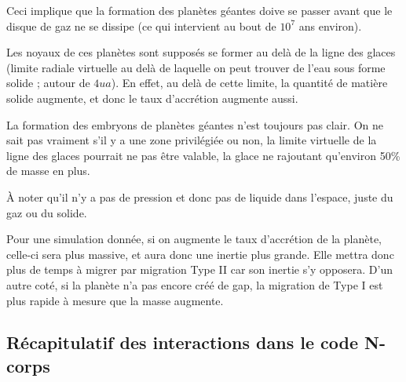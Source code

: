 Ceci implique que la formation des planètes géantes doive se passer avant que le disque de gaz ne se dissipe (ce qui intervient au bout de $10^7$ ans environ).

Les noyaux de ces planètes sont supposés se former au delà de la ligne des glaces (limite radiale virtuelle au delà de laquelle on peut trouver de l'eau sous forme solide ; autour de $4\unit{ua}$). En effet, au delà de cette limite, la quantité de matière solide augmente, et donc le taux d'accrétion augmente aussi.

\begin{attention}
La formation des embryons de planètes géantes n'est toujours pas clair. On ne sait pas vraiment s'il y a une zone privilégiée ou non, la limite virtuelle de la ligne des glaces pourrait ne pas être valable, la glace ne rajoutant qu'environ 50\% de masse en plus.

À noter qu'il n'y a pas de pression et donc pas de liquide dans l'espace, juste du gaz ou du solide.
\end{attention}

\bigskip

Pour une simulation donnée, si on augmente le taux d'accrétion de la planète, celle-ci sera plus massive, et aura donc une inertie plus grande. Elle mettra donc plus de temps à migrer par migration Type II car son inertie s'y opposera. D'un autre coté, si la planète n'a pas encore créé de gap, la migration de Type I est plus rapide à mesure que la masse augmente. 


\subsection{Récapitulatif des interactions dans le code N-corps}
